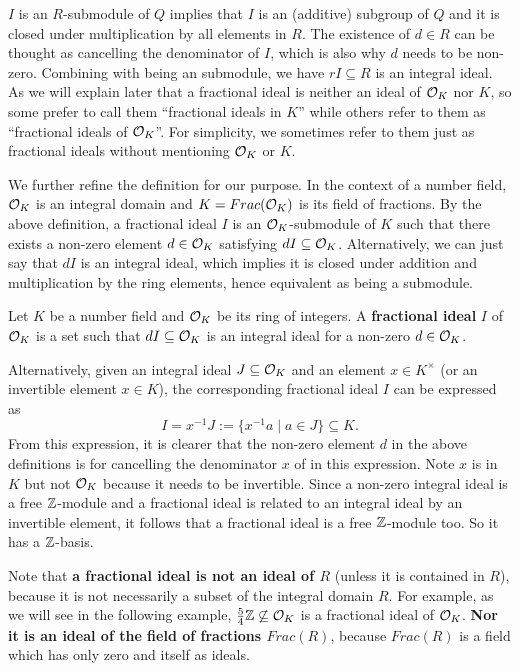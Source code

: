 \documentclass[../main.tex]{subfiles}
\begin{document}
$I$ is an $R$-submodule of $Q$ implies that $I$ is an (additive) subgroup of $Q$ and it is closed under multiplication by all elements in $R$. The existence of $d \in R$ can be thought as cancelling the denominator of $I$, which is also why $d$ needs to be non-zero. Combining with being an submodule, we have $rI \subseteq R$ is an integral ideal. As we will explain later that a fractional ideal is neither an ideal of $\mathcal{O}_K$ nor $K$, so some prefer to call them ``fractional ideals in $K$'' while others refer to them as ``fractional ideals of $\mathcal{O}_K$''. For simplicity, we sometimes refer to them just as fractional ideals without mentioning $\mathcal{O}_K$ or $K$.

We further refine the definition for our purpose. In the context of a number field, $\mathcal{O}_K$ is an integral domain and $K=Frac(\mathcal{O}_K)$ is its field of fractions. By the above definition, a fractional ideal $I$ is an $\mathcal{O}_K$-submodule of $K$ such that there exists a non-zero element $d \in \mathcal{O}_K$ satisfying $dI \subseteq \mathcal{O}_K$. Alternatively, we can just say that $dI$ is an integral ideal, which implies it is closed under addition and multiplication by the ring elements, hence equivalent as being a submodule. 
\begin{definition}
\label{app def:fracIdeal2}
Let $K$ be a number field and $\mathcal{O}_K$ be its ring of integers. A \textbf{fractional ideal} $I$ of $\mathcal{O}_K$ is a set such that $dI \subseteq \mathcal{O}_K$ is an integral ideal for a non-zero $d \in \mathcal{O}_K$.  
\end{definition}

Alternatively, given an integral ideal $J \subseteq \mathcal{O}_K$ and an element $x \in K^{\times}$ (or an invertible element $x \in K$), the corresponding fractional ideal $I$ can be expressed as 
\begin{equation*}
I = x^{-1} J := \{x^{-1} a \mid a \in J\} \subseteq K.
\end{equation*}
From this expression, it is clearer that the non-zero element $d$ in the above definitions is for cancelling the denominator $x$ of in this expression. Note $x$ is in $K$ but not $\mathcal{O}_K$ because it needs to be invertible. Since a non-zero integral ideal is a free $\mathbb{Z}$-module and a fractional ideal is related to an integral ideal by an invertible element, it follows that a fractional ideal is a 
\reversemarginpar
{}
free $\mathbb{Z}$-module too. So it has a $\mathbb{Z}$-basis.   

Note that \textbf{a fractional ideal is not an ideal of $R$} (unless it is contained in $R$), because it is not necessarily a subset of the integral domain $R$. For example, as we will see in the following example, $\frac{5}{4}\mathbb{Z} \not\subseteq \mathcal{O}_K$ is a fractional ideal of $\mathcal{O}_K$. \textbf{Nor it is an ideal of the field of fractions $Frac(R)$}, because $Frac(R)$ is a field which has only zero and itself as ideals. 
\end{document}
